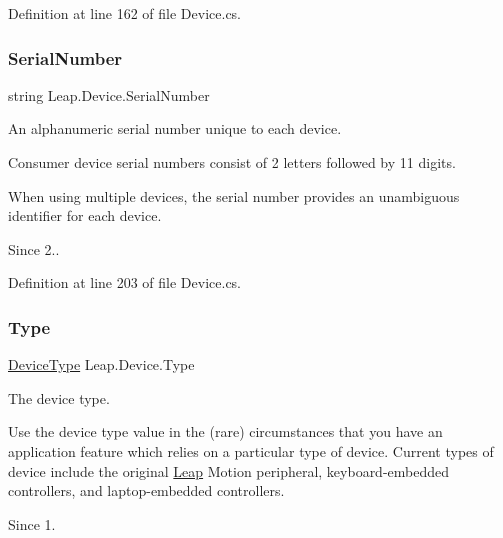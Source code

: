 Definition at line 162 of file Device.\+cs.

\mbox{\label{class_leap_1_1_device_a26012df4a3abc27d41c002192afa8579}} 
\subsubsection{\texorpdfstring{SerialNumber}{SerialNumber}}
{\footnotesize\ttfamily string Leap.\+Device.\+Serial\+Number\hspace{0.3cm}{\ttfamily [get]}}



An alphanumeric serial number unique to each device. 

Consumer device serial numbers consist of 2 letters followed by 11 digits.

When using multiple devices, the serial number provides an unambiguous identifier for each device. \begin{DoxySince}{Since}
2.. 
\end{DoxySince}


Definition at line 203 of file Device.\+cs.

\mbox{\label{class_leap_1_1_device_aa191da9618d51fa0d1a1890aa9814218}} 
\subsubsection{\texorpdfstring{Type}{Type}}
{\footnotesize\ttfamily \mbox{\hyperlink{class_leap_1_1_device_acbae26ae873dec763876ed257b38456f}{Device\+Type}} Leap.\+Device.\+Type\hspace{0.3cm}{\ttfamily [get]}}



The device type. 

Use the device type value in the (rare) circumstances that you have an application feature which relies on a particular type of device. Current types of device include the original \mbox{\hyperlink{namespace_leap}{Leap}} Motion peripheral, keyboard-\/embedded controllers, and laptop-\/embedded controllers.

\begin{DoxySince}{Since}
1. 
\end{DoxySince}


